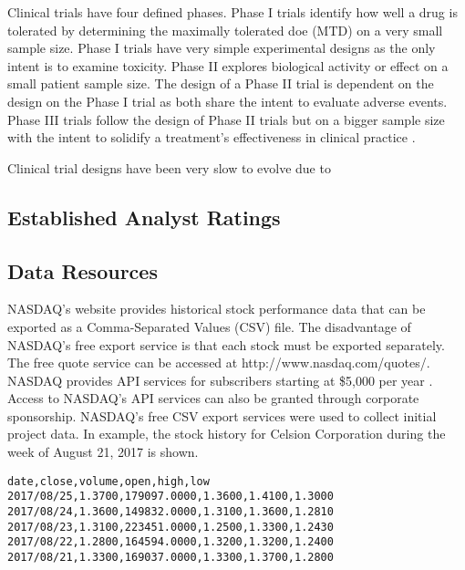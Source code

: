 \documentclass[sigconf]{acmart}
\begin{document}
Clinical trials have four defined phases. Phase I trials identify how well a drug is tolerated by determining the maximally tolerated doe (MTD) on a very small sample size. Phase I trials have very simple experimental designs as the only intent is to examine toxicity. Phase II explores biological activity or effect on a small patient sample size. The design of a Phase II trial is dependent on the design on the Phase I trial as both share the intent to evaluate adverse events. Phase III trials follow the design of Phase II trials but on a bigger sample size with the intent to solidify a treatment's effectiveness in clinical practice \cite{Friedman}. 

Clinical trial designs have been very slow to evolve due to %

\subsection{Established Analyst Ratings}






\subsection{Data Resources}
NASDAQ's website provides historical stock performance data that can be exported as a Comma-Separated Values (CSV) file. The disadvantage of NASDAQ's free export service is that each stock must be exported separately. The free quote service can be accessed at http://www.nasdaq.com/quotes/. NASDAQ provides API services for subscribers starting at \$5,000 per year \cite{www-nasdaq-sub}. Access to NASDAQ's API services can also be granted through corporate sponsorship. NASDAQ's free CSV export services were used to collect initial project data. In example, the stock history for Celsion Corporation during the week of August 21, 2017 is shown.

\begin{mdframed}[style=default]
\begin{lstlisting}
date,close,volume,open,high,low
2017/08/25,1.3700,179097.0000,1.3600,1.4100,1.3000
2017/08/24,1.3600,149832.0000,1.3100,1.3600,1.2810
2017/08/23,1.3100,223451.0000,1.2500,1.3300,1.2430
2017/08/22,1.2800,164594.0000,1.3200,1.3200,1.2400
2017/08/21,1.3300,169037.0000,1.3300,1.3700,1.2800
\end{lstlisting}
\end{mdframed} 
\end{document}
